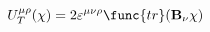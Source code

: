 \begin{equation}
U_T^{\mu \rho }(\chi )=2\varepsilon ^{\mu \nu \rho }\func{tr}({\bf
B}_{\nu }\chi )
\end{equation}

